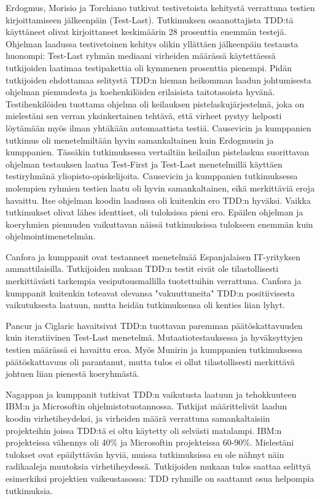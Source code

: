 \documentclass[finnish]{tktltiki2}
\theoremstyle{definition}
\theoremstyle{remark}
\begin{document}
Erdogmus, Morisio ja Torchiano \cite{Erdogmus05} tutkivat testivetoista kehitystä verrattuna testien kirjoittamiseen jälkeenpäin (Test-Last). Tutkimuksen osaanottajista TDD:tä käyttäneet olivat kirjoittaneet keskimäärin 28 prosenttia enemmän testejä. Ohjelman laadussa testivetoinen kehitys olikin yllättäen jälkeenpäin testausta huonompi: Test-Last ryhmän mediaani virheiden määrässä käytettäessä tutkijoiden laatimaa testipakettia oli kymmenen prosenttia pienempi. Pidän tutkijoiden ehdottamaa selitystä TDD:n hieman heikomman laadun johtumisesta ohjelman pienuudesta ja koehenkilöiden erilaisista taitotasoista hyvänä. Testihenkilöiden tuottama ohjelma oli keilauksen pistelaskujärjestelmä, joka on mielestäni sen verran yksinkertainen tehtävä, että virheet pystyy helposti löytämään myös ilman yhtäkään automaattista testiä. Causevicin ja kumppanien \cite{Causevic12} tutkimus oli menetelmiltään hyvin samankaltainen kuin Erdogmusin ja kumppanien. Tässäkin tutkimuksessa vertailtiin keilailun pistelaskua suorittavan ohjelman testauksen laatua Test-First ja Test-Last menetelmillä käyttäen testiryhmänä yliopisto-opiskelijoita. Causevicin ja kumppanien tutkimuksessa molempien ryhmien testien laatu oli hyvin samankaltainen, eikä merkittäviä eroja havaittu. Itse ohjelman koodin laadussa oli kuitenkin ero TDD:n hyväksi. Vaikka tutkimukset olivat lähes identtiset,  oli tuloksissa pieni ero. Epäilen ohjelman ja koeryhmien pienuuden vaikuttavan näissä tutkimuksissa tulokseen enemmän kuin ohjelmointimenetelmän.

 Canfora ja kumppanit \cite{Canfora06} ovat testanneet menetelmää Espanjalaisen IT-yrityksen ammattilaisilla. Tutkijoiden mukaan TDD:n testit eivät ole tilastollisesti merkittävästi tarkempia vesiputousmallilla tuotettuihin verrattuna. Canfora ja kumppanit kuitenkin toteavat olevansa "vakuuttuneita" TDD:n positiivisesta vaikutuksesta laatuun, mutta heidän tutkimuksensa oli kenties liian lyhyt.

Pancur ja Ciglaric \cite{Pancur11} havaitsivat TDD:n tuottavan paremman päätöskattavuuden kuin iteratiivinen Test-Last menetelmä. Mutaatiotestauksessa ja hyväksyttyjen testien määrässä ei havaittu eroa. Myös Munirin ja kumppanien \cite{Munir14} tutkimuksessa päätöskattavuus oli parantanut, mutta tulos ei ollut tilastollisesti merkittävä johtuen liian pienestä koeryhmästä.

Nagappan ja kumppanit \cite{Nagappan08} tutkivat TDD:n vaikutusta laatuun ja tehokkuuteen IBM:n ja Microsoftin ohjelmistotuotannossa. Tutkijat määrittelivät laadun koodin virhetiheydeksi, ja virheiden määrä verrattuna samankaltaisiin projekteihin joissa TDD:tä ei oltu käytetty oli selvästi matalampi. IBM:n projekteissa vähennys oli 40\% ja Microsoftin projekteissa 60-90\%. Mielestäni tulokset ovat epäilyttävän hyviä, muissa tutkimuksissa en ole nähnyt näin radikaaleja muutoksia virhetiheydessä. Tutkijoiden mukaan tulos saattaa selittyä esimerkiksi projektien vaikeustasossa: TDD ryhmille on saattanut osua helpompia tutkimuksia.
\end{document}
